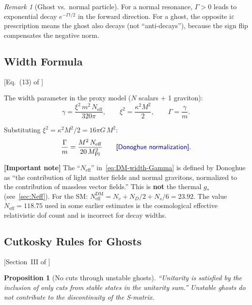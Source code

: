 \documentclass[11pt,a4paper]{article}
\theoremstyle{plain}
\newtheorem{proposition}[theorem]{Proposition}
\theoremstyle{definition}
\theoremstyle{remark}
\newtheorem{remark}[theorem]{Remark}
\newcommand{\ii}{\mathrm{i}}
\newcommand{\MPl}{M_{\mathrm{Pl}}}
\newcommand{\Neff}{N_{\mathrm{eff}}}
\newcommand{\fromlit}[1]{\textcolor{blue!70!black}{\textsf{[#1]}}}
\newcommand{\signcorrection}[1]{%
  \par\smallskip\noindent
  \colorbox{red!10}{\parbox{\dimexpr\linewidth-2\fboxsep}{%
    \textcolor{red!60!black}{\textbf{[Important note]}} #1}}%
  \par\smallskip}
\begin{document}
\begin{remark}[Ghost vs.\ normal particle]
For a normal resonance, $\Gamma > 0$ leads to exponential decay
$e^{-\Gamma t/2}$ in the forward direction.  For a ghost, the opposite
$\ii\varepsilon$ prescription means the ghost also decays (not
``anti-decays''), because the sign flip compensates the negative norm.
\end{remark}

\subsection{Width Formula}

\fromlit{Eq.~(13) of \cite{Donoghue2019}}

The width parameter in the proxy model ($N$ scalars + 1 graviton):
\begin{equation}\label{eq:DM-width}
  \gamma = \frac{\xi^2\,m^2\,\Neff}{320\pi},
  \qquad
  \xi^2 = \frac{\kappa^2 M^2}{2},
  \qquad
  \Gamma = \frac{\gamma}{m}.
\end{equation}

Substituting $\xi^2 = \kappa^2 M^2/2 = 16\pi G\,M^2$:
\begin{equation}\label{eq:DM-width-Gamma}
  \frac{\Gamma}{m}
  = \frac{M^2\,\Neff}{20\,\MPl^2}
  \qquad \fromlit{Donoghue normalization}.
\end{equation}

\signcorrection{The ``$\Neff$'' in~\eqref{eq:DM-width-Gamma} is
defined by Donoghue as ``the contribution of light matter fields
and normal gravitons, normalized to the contribution of massless
vector fields.''  This is \textbf{not} the thermal $g_*$
(see~\cref{sec:Neff}).  For the SM:
$\Neff^{\mathrm{DM}} = N_v + N_D/2 + N_s/6 = 23.92$.
The value $\Neff = 118.75$ used in some earlier estimates is the
cosmological effective relativistic dof count and is incorrect for
decay widths.}

\subsection{Cutkosky Rules for Ghosts}

\fromlit{Section~III of \cite{Donoghue2019}}

\begin{proposition}[No cuts through unstable ghosts]
\label{prop:cutkosky}
``Unitarity is satisfied by the inclusion of only cuts from stable states
in the unitarity sum.''  Unstable ghosts do not contribute to the
discontinuity of the S-matrix.
\end{proposition}
\end{document}
